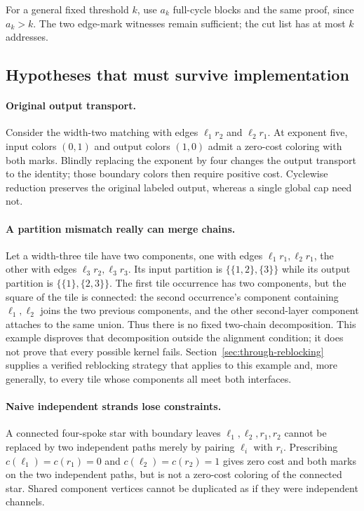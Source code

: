 For a general fixed threshold $k$, use $a_k$ full-cycle blocks and the
same proof, since $a_k>k$.  The two edge-mark witnesses remain sufficient;
the cut list has at most $k$ addresses.

\subsection{Hypotheses that must survive implementation}

\paragraph{Original output transport.}
Consider the width-two matching with edges $\ell_1r_2$ and $\ell_2r_1$.
At exponent five, input colors $(0,1)$ and output colors $(1,0)$ admit
a zero-cost coloring with both marks.  Blindly replacing the exponent
by four changes the output transport to the identity; those boundary
colors then require positive cost.  Cyclewise reduction preserves the
original labeled output, whereas a single global cap need not.

\paragraph{A partition mismatch really can merge chains.}
Let a width-three tile have two components, one with edges
$\ell_1r_1,\ell_2r_1$, the other with edges
$\ell_3r_2,\ell_3r_3$.  Its input partition is
$\{\{1,2\},\{3\}\}$ while its output partition is
$\{\{1\},\{2,3\}\}$.  The first tile occurrence has two components,
but the square of the tile is connected: the second occurrence's component
containing $\ell_1,\ell_2$ joins the two previous components, and the other
second-layer component attaches to the same union.  Thus there is no fixed
two-chain decomposition.  This example disproves that decomposition outside
the alignment condition; it does not prove that every possible kernel fails.
Section~\ref{sec:through-reblocking} supplies a verified reblocking strategy
that applies to this example and, more generally, to every tile whose
components all meet both interfaces.

\paragraph{Naive independent strands lose constraints.}
A connected four-spoke star with boundary leaves
$\ell_1,\ell_2,r_1,r_2$ cannot be replaced by two independent paths
merely by pairing $\ell_i$ with $r_i$.  Prescribing
$c(\ell_1)=c(r_1)=0$ and $c(\ell_2)=c(r_2)=1$ gives zero cost and both
marks on the two independent paths, but is not a zero-cost coloring of
the connected star.  Shared component vertices cannot be duplicated as
if they were independent channels.

